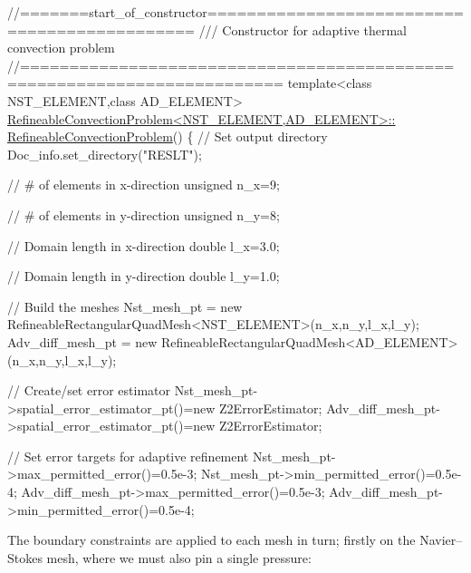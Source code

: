  
\begin{DoxyCodeInclude}
\textcolor{comment}{//=======start\_of\_constructor=============================================}
\textcolor{comment}{/// Constructor for adaptive thermal convection problem}
\textcolor{comment}{}\textcolor{comment}{//========================================================================}
\textcolor{keyword}{template}<\textcolor{keyword}{class} NST\_ELEMENT,\textcolor{keyword}{class} AD\_ELEMENT>
\hyperlink{classRefineableConvectionProblem_a97e661986093402bf55fb6c32b782ddc}{RefineableConvectionProblem<NST\_ELEMENT,AD\_ELEMENT>::}
\hyperlink{classRefineableConvectionProblem_a97e661986093402bf55fb6c32b782ddc}{RefineableConvectionProblem}()
\{ 
 \textcolor{comment}{// Set output directory}
 Doc\_info.set\_directory(\textcolor{stringliteral}{"RESLT"});
 
 \textcolor{comment}{// # of elements in x-direction}
 \textcolor{keywordtype}{unsigned} n\_x=9;

 \textcolor{comment}{// # of elements in y-direction}
 \textcolor{keywordtype}{unsigned} n\_y=8;

 \textcolor{comment}{// Domain length in x-direction}
 \textcolor{keywordtype}{double} l\_x=3.0;

 \textcolor{comment}{// Domain length in y-direction}
 \textcolor{keywordtype}{double} l\_y=1.0;
 
 \textcolor{comment}{// Build the meshes}
 Nst\_mesh\_pt =
  \textcolor{keyword}{new} RefineableRectangularQuadMesh<NST\_ELEMENT>(n\_x,n\_y,l\_x,l\_y);
 Adv\_diff\_mesh\_pt =
  \textcolor{keyword}{new} RefineableRectangularQuadMesh<AD\_ELEMENT>(n\_x,n\_y,l\_x,l\_y);

 \textcolor{comment}{// Create/set error estimator}
 Nst\_mesh\_pt->spatial\_error\_estimator\_pt()=\textcolor{keyword}{new} Z2ErrorEstimator;
 Adv\_diff\_mesh\_pt->spatial\_error\_estimator\_pt()=\textcolor{keyword}{new} Z2ErrorEstimator;

 \textcolor{comment}{// Set error targets for adaptive refinement}
 Nst\_mesh\_pt->max\_permitted\_error()=0.5e-3; 
 Nst\_mesh\_pt->min\_permitted\_error()=0.5e-4; 
 Adv\_diff\_mesh\_pt->max\_permitted\_error()=0.5e-3; 
 Adv\_diff\_mesh\_pt->min\_permitted\_error()=0.5e-4; 

\end{DoxyCodeInclude}


The boundary constraints are applied to each mesh in turn; firstly on the Navier--Stokes mesh, where we must also pin a single pressure\+:



